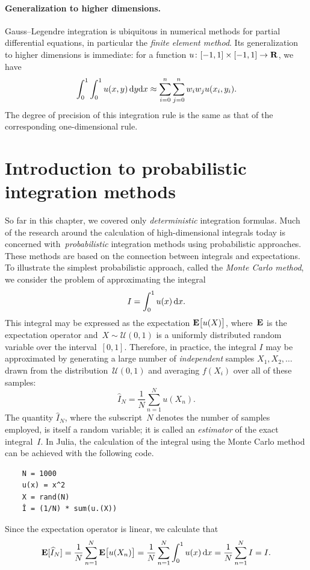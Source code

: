 \paragraph{Generalization to higher dimensions.}
Gauss--Legendre integration is ubiquitous in numerical methods for partial differential equations,
in particular the \emph{finite element method}.
Its generalization to higher dimensions is immediate:
for a function $u\colon [-1, 1] \times [-1, 1] \to \mathbf R$,
we have
\[
    \int_{0}^{1} \int_{0}^{1} u(x, y) \, \mathrm d y \mathrm d x \approx \sum_{i=0}^{n} \sum_{j=0}^{n} w_i w_j u(x_i, y_i).
\]
The degree of precision of this integration rule is the same as
that of the corresponding one-dimensional rule.

\section{Introduction to probabilistic integration methods}
So far in this chapter,
we covered only \emph{deterministic} integration formulas.
Much of the research around the calculation of high-dimensional integrals today is concerned with~\emph{probabilistic} integration methods using probabilistic approaches.
These methods are based on the connection between integrals and expectations.
To illustrate the simplest probabilistic approach,
called the \emph{Monte Carlo method},
we consider the problem of approximating the integral
\[
    I = \int_{0}^{1} u(x) \, \mathrm d x.
\]
This integral may be expressed as the expectation $\mathbf E \bigl[u(X)\bigr]$,
where~$\mathbf E$ is the expectation operator and~$X \sim \mathcal U(0, 1)$ is a uniformly distributed random variable over the interval~$[0, 1]$.
Therefore, in practice,
the integral $I$ may be approximated by generating a large number of \emph{independent} samples $X_1, X_2,\dotsc$ drawn from the distribution~$\mathcal U(0, 1)$
and averaging $f(X_i)$ over all of these samples:
\[
    \widehat I_N = \frac{1}{N} \sum_{n=1}^{N} u(X_n).
\]
The quantity $\widehat I_N$,
where the subscript~$N$ denotes the number of samples employed,
is itself a random variable;
it is called an \emph{estimator} of the exact integral~$I$.
In Julia, the calculation of the integral using the Monte Carlo method can be achieved with the following code.
\begin{verbatim}
    N = 1000
    u(x) = x^2
    X = rand(N)
    Î = (1/N) * sum(u.(X))
\end{verbatim}
Since the expectation operator is linear,
we calculate that
\[
    \mathbf E[\widehat I_N] = \frac{1}{N} \sum_{n=1}^{N} \mathbf E \bigl[u(X_n)\bigr] = \frac{1}{N} \sum_{n=1}^{N} \int_{0}^{1} u(x) \, \mathrm d x = \frac{1}{N} \sum_{n=1}^{N} I = I.
\]
